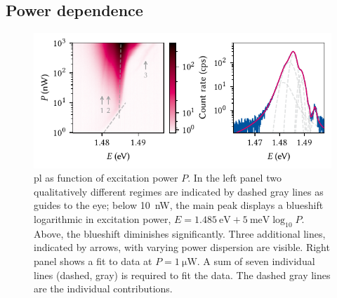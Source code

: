 \subsection{Power dependence}\label{subsec:exp:observations:pl:power}
\begin{figure}
    \centering
    \includegraphics{img/pdf/experiment/doped_M1_05_49-2_power}
    \caption[
        \protect\newline
    ]{
        \Gls{pl} as function of excitation power $P$.
        In the left panel two qualitatively different regimes are indicated by dashed gray lines as guides to the eye; below \qty{10}{\nano\watt}, the main peak displays a blueshift logarithmic in excitation power, $E = \qty{1.485}{\electronvolt} + \qty{5}{\milli\electronvolt}\log_{10} P$.
        Above, the blueshift diminishes significantly.
        Three additional lines, indicated by arrows, with varying power dispersion are visible.
        Right panel shows a fit to data at $P=\qty{1}{\micro\watt}$.
        A sum of seven individual lines (dashed, gray) is required to fit the data.
        The dashed gray lines are the individual contributions.
    }
    \label{fig:exp:pl:doped_M1_05_49-2_power}
\end{figure}

